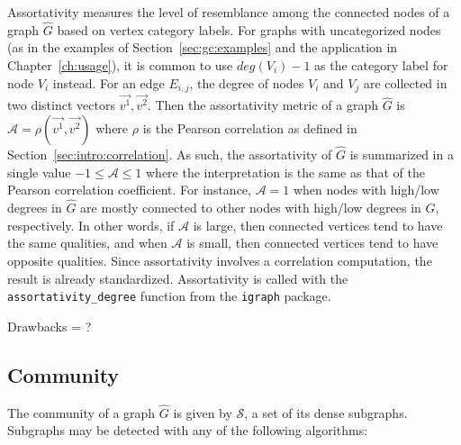 Assortativity measures the level of resemblance among the connected nodes of a 
graph $\hat{G}$ based on vertex category labels. For graphs with uncategorized 
nodes (as in the examples of Section~\ref{sec:gc:examples} and the application 
in Chapter~\ref{ch:usage}), it is common to use $deg(V_i)-1$
as the category label for node $V_i$ instead. For 
an edge $E_{i,j}$, the degree of nodes $V_i$ and $V_j$ are collected in two 
distinct vectors $\overrightarrow{v^1}, \overrightarrow{v^2}$. Then the 
assortativity metric of a graph $\hat{G}$ is $\mathcal{A} = 
\rho(\overrightarrow{v^1},\overrightarrow{v^2})$ where $\rho$ is the Pearson 
correlation as defined in Section~\ref{sec:intro:correlation}. As such, 
the assortativity of $\hat{G}$ is summarized in a single value 
$-1 \leq \mathcal{A} \leq 1$ where the interpretation is the same as that of 
the Pearson correlation coefficient. For instance, $\mathcal{A}=1$ when nodes 
with high/low degrees in $\hat{G}$ are mostly connected to other nodes with 
high/low degrees in $\hat{G}$, respectively. In other words, if 
$\mathcal{A}$ is large, then connected vertices tend to have the same 
qualities, and when $\mathcal{A}$ is small, then connected vertices tend to 
have opposite qualities. Since assortativity involves a correlation 
computation, the result is already standardized.
Assortativity is called with the \texttt{assortativity\_degree} function from 
the \texttt{igraph} package.

Drawbacks = ?

\subsection{Community}

The community of a graph $\hat{G}$ is given by $\mathcal{S}$, a set of its 
dense subgraphs. Subgraphs may be detected with any of the following algorithms:

